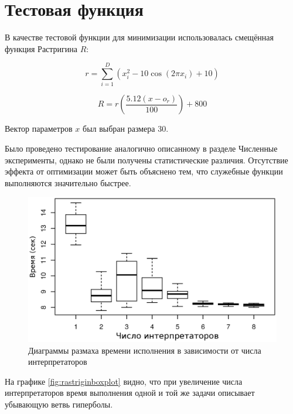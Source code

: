 \section*{Тестовая функция}

В качестве тестовой функции для минимизации
использовалась смещённая функция Растригина $R$:

\begin{equation*}
    r = \sum_{i = 1}^{D}(x_i^2 - 10\cos(2 \pi x_i) + 10)
\end{equation*}

\begin{equation*}
    R = r\left(\frac{5.12 (x - o_r)}{100}\right) + 800
\end{equation*}

Вектор параметров $x$ был выбран размера 30.

Было проведено тестирование
аналогично описанному в разделе
Численные эксперименты,
однако не были получены
статистические различия.
Отсутствие эффекта
от оптимизации может
быть объяснено тем,
что служебные функции
выполняются значительно быстрее.

\begin{figure}[h]
\includegraphics{rastrigin}
\caption{Диаграммы размаха времени исполнения
в зависимости от числа интерпретаторов}
\label{fig:rastriginboxplot}
\end{figure}

На графике \eqref{fig:rastriginboxplot} видно,
что при увеличение числа интерпретаторов
время выполнения одной и той же задачи
описывает убывающую ветвь гиперболы.

